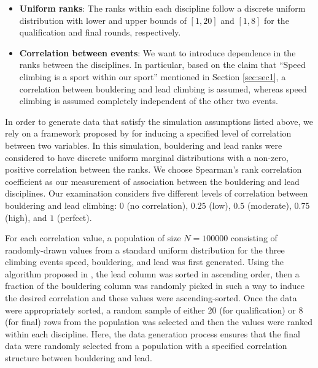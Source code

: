 \documentclass[letterpaper, inpress]{jds} %
\begin{document}
\vspace{1mm}

\begin{itemize}

\item
  \textbf{Uniform ranks}: The ranks within each discipline follow a
  discrete uniform distribution with lower and upper bounds of
  \([1, 20]\) and \([1, 8]\) for the qualification and final rounds,
  respectively.
  
\vspace{1mm}

\item
  \textbf{Correlation between events}: We want to introduce dependence
  in the ranks between the disciplines. In particular, based on the
  claim that ``Speed climbing is a sport within our sport'' mentioned in Section \ref{sec:sec1}, a correlation between bouldering and lead climbing is
  assumed, whereas speed climbing is assumed completely independent of
  the other two events.
  
\end{itemize}

\vspace{1mm}

In order to generate data that satisfy the simulation assumptions listed
above, we rely on a framework proposed by \cite{Demirtas2019} for inducing a
specified level of correlation between two variables. In this
simulation, bouldering and lead ranks were considered to have discrete
uniform marginal distributions with a non-zero, positive correlation
between the ranks. We choose Spearman's rank correlation coefficient
\citep{spearman} as our measurement of association between the
bouldering and lead disciplines. Our examination considers five
different levels of correlation between bouldering and lead climbing:
\(0\) (no correlation), \(0.25\) (low), \(0.5\) (moderate), \(0.75\)
(high), and \(1\) (perfect).

For each correlation value, a population of size \(N=100000\) consisting
of randomly-drawn values from a standard uniform distribution for the
three climbing events speed, bouldering, and lead was first generated.
Using the algorithm proposed in \cite{Demirtas2019}, the lead column was
sorted in ascending order, then a fraction of the bouldering column was
randomly picked in such a way to induce the desired correlation and
these values were ascending-sorted. Once the data were appropriately
sorted, a random sample of either 20 (for qualification) or 8 (for
final) rows from the population was selected and then the values were
ranked within each discipline. Here, the data generation process ensures
that the final data were randomly selected from a population with a
specified correlation structure between bouldering and lead.
\end{document}
